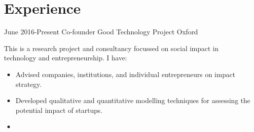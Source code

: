 \documentclass[12pt,a4paper,sans]{moderncv}
\begin{document}
\maketitle

\section{Experience}
\cventry
{June 2016-Present}
{Co-founder}
{Good Technology Project}
{Oxford}
{}
{
  This is a research project and consultancy focussed on social impact in technology and
  entrepreneurship. I have:
  \begin{itemize}
    \item Advised companies, institutions, and individual entrepreneurs on impact strategy.
    \item Developed qualitative and quantitative modelling techniques for
      assessing the potential impact of startups.
    \item 
  \end{itemize}
}
\end{document}
